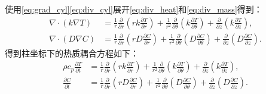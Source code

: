 \documentclass[12pt,a4paper,fontset=none]{ctexart}
\begin{document}
使用\eqref{eq:grad_cyl}\eqref{eq:div_cyl}展开\eqref{eq:div_heat}和\eqref{eq:div_mass}得到：
\begin{align}
\nabla\cdot(k\nabla T) &= \frac1r\frac{\partial}{\partial r}\left(rk\frac{\partial T}{\partial r}\right) + \frac{1}{r^2}\frac{\partial}{\partial\theta}\left(k\frac{\partial T}{\partial\theta}\right) + \frac{\partial}{\partial z}\left(k\frac{\partial T}{\partial z}\right),\label{eq:div_heat_cyl}\\[10pt]
\nabla\cdot(D\nabla C) &= \frac1r\frac{\partial}{\partial r}\left(rD\frac{\partial C}{\partial r}\right) + \frac{1}{r^2}\frac{\partial}{\partial\theta}\left(D\frac{\partial C}{\partial\theta}\right) + \frac{\partial}{\partial z}\left(D\frac{\partial C}{\partial z}\right).\label{eq:div_mass_cyl}
\end{align}
得到柱坐标下的热质耦合方程如下：
\begin{align}
\rho c_p\frac{\partial T}{\partial t}
&=\frac1r\frac{\partial}{\partial r}\left(rk\frac{\partial T}{\partial r}\right)
+\frac{1}{r^2}\frac{\partial}{\partial\theta}\left(k\frac{\partial T}{\partial\theta}\right)
+\frac{\partial}{\partial z}\left(k\frac{\partial T}{\partial z}\right),\label{eq:cyl_heat}\\[10pt]
\frac{\partial C}{\partial t}
&=\frac1r\frac{\partial}{\partial r}\left(rD\frac{\partial C}{\partial r}\right)
+\frac{1}{r^2}\frac{\partial}{\partial\theta}\left(D\frac{\partial C}{\partial\theta}\right)
+\frac{\partial}{\partial z}\left(D\frac{\partial C}{\partial z}\right).\label{eq:cyl_mass}
\end{align}
\end{document}

